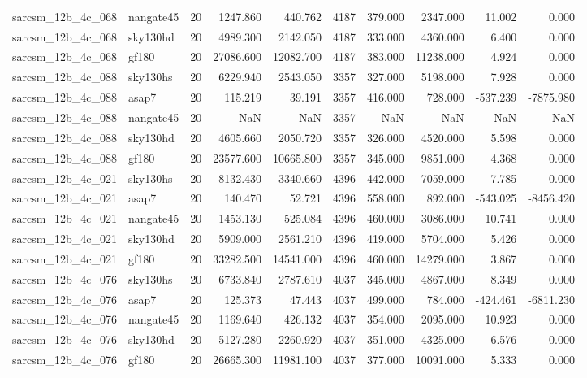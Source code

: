 \begin{tabular}{llrrrrrrrr}
sarcsm\_12b\_4c\_068 & nangate45 & 20 & 1247.860 & 440.762 & 4187 & 379.000 & 2347.000 & 11.002 & 0.000 \\
sarcsm\_12b\_4c\_068 & sky130hd & 20 & 4989.300 & 2142.050 & 4187 & 333.000 & 4360.000 & 6.400 & 0.000 \\
sarcsm\_12b\_4c\_068 & gf180 & 20 & 27086.600 & 12082.700 & 4187 & 383.000 & 11238.000 & 4.924 & 0.000 \\
sarcsm\_12b\_4c\_088 & sky130hs & 20 & 6229.940 & 2543.050 & 3357 & 327.000 & 5198.000 & 7.928 & 0.000 \\
sarcsm\_12b\_4c\_088 & asap7 & 20 & 115.219 & 39.191 & 3357 & 416.000 & 728.000 & -537.239 & -7875.980 \\
sarcsm\_12b\_4c\_088 & nangate45 & 20 & NaN & NaN & 3357 & NaN & NaN & NaN & NaN \\
sarcsm\_12b\_4c\_088 & sky130hd & 20 & 4605.660 & 2050.720 & 3357 & 326.000 & 4520.000 & 5.598 & 0.000 \\
sarcsm\_12b\_4c\_088 & gf180 & 20 & 23577.600 & 10665.800 & 3357 & 345.000 & 9851.000 & 4.368 & 0.000 \\
sarcsm\_12b\_4c\_021 & sky130hs & 20 & 8132.430 & 3340.660 & 4396 & 442.000 & 7059.000 & 7.785 & 0.000 \\
sarcsm\_12b\_4c\_021 & asap7 & 20 & 140.470 & 52.721 & 4396 & 558.000 & 892.000 & -543.025 & -8456.420 \\
sarcsm\_12b\_4c\_021 & nangate45 & 20 & 1453.130 & 525.084 & 4396 & 460.000 & 3086.000 & 10.741 & 0.000 \\
sarcsm\_12b\_4c\_021 & sky130hd & 20 & 5909.000 & 2561.210 & 4396 & 419.000 & 5704.000 & 5.426 & 0.000 \\
sarcsm\_12b\_4c\_021 & gf180 & 20 & 33282.500 & 14541.000 & 4396 & 460.000 & 14279.000 & 3.867 & 0.000 \\
sarcsm\_12b\_4c\_076 & sky130hs & 20 & 6733.840 & 2787.610 & 4037 & 345.000 & 4867.000 & 8.349 & 0.000 \\
sarcsm\_12b\_4c\_076 & asap7 & 20 & 125.373 & 47.443 & 4037 & 499.000 & 784.000 & -424.461 & -6811.230 \\
sarcsm\_12b\_4c\_076 & nangate45 & 20 & 1169.640 & 426.132 & 4037 & 354.000 & 2095.000 & 10.923 & 0.000 \\
sarcsm\_12b\_4c\_076 & sky130hd & 20 & 5127.280 & 2260.920 & 4037 & 351.000 & 4325.000 & 6.576 & 0.000 \\
sarcsm\_12b\_4c\_076 & gf180 & 20 & 26665.300 & 11981.100 & 4037 & 377.000 & 10091.000 & 5.333 & 0.000 \\

\end{tabular}
